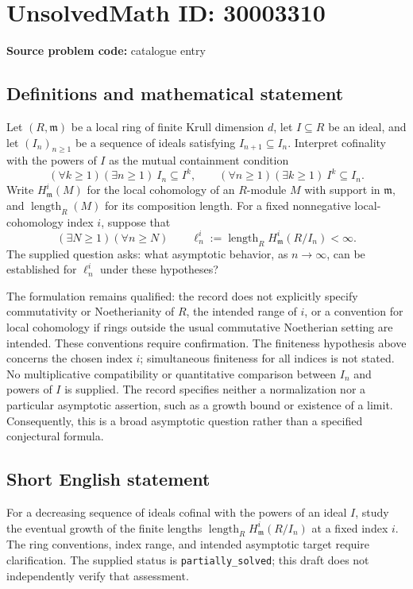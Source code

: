 \documentclass[11pt]{article}
\begin{document}
\section*{UnsolvedMath ID: 30003310}
\textbf{Source problem code:} catalogue entry
\subsection{Definitions and mathematical statement}
Let \((R,\mathfrak m)\) be a local ring of finite Krull dimension \(d\), let \(I\subseteq R\) be an ideal, and let \((I_n)_{n\geq 1}\) be a sequence of ideals satisfying \(I_{n+1}\subseteq I_n\). Interpret cofinality with the powers of \(I\) as the mutual containment condition
\[
(\forall k\geq 1)(\exists n\geq 1)\ I_n\subseteq I^k,
\qquad
(\forall n\geq 1)(\exists k\geq 1)\ I^k\subseteq I_n.
\]
Write \(H^i_{\mathfrak m}(M)\) for the local cohomology of an \(R\)-module \(M\) with support in \(\mathfrak m\), and \(\operatorname{length}_R(M)\) for its composition length. For a fixed nonnegative local-cohomology index \(i\), suppose that
\[
(\exists N\geq 1)(\forall n\geq N)\qquad
\ell_n^i:=\operatorname{length}_R H^i_{\mathfrak m}(R/I_n)<\infty.
\]
The supplied question asks: what asymptotic behavior, as \(n\to\infty\), can be established for \(\ell_n^i\) under these hypotheses?

The formulation remains qualified: the record does not explicitly specify commutativity or Noetherianity of \(R\), the intended range of \(i\), or a convention for local cohomology if rings outside the usual commutative Noetherian setting are intended. These conventions require confirmation. The finiteness hypothesis above concerns the chosen index \(i\); simultaneous finiteness for all indices is not stated. No multiplicative compatibility or quantitative comparison between \(I_n\) and powers of \(I\) is supplied. The record specifies neither a normalization nor a particular asymptotic assertion, such as a growth bound or existence of a limit. Consequently, this is a broad asymptotic question rather than a specified conjectural formula.
\subsection{Short English statement}
For a decreasing sequence of ideals cofinal with the powers of an ideal \(I\), study the eventual growth of the finite lengths \(\operatorname{length}_R H^i_{\mathfrak m}(R/I_n)\) at a fixed index \(i\). The ring conventions, index range, and intended asymptotic target require clarification. The supplied status is \texttt{partially\_solved}; this draft does not independently verify that assessment.
\end{document}
